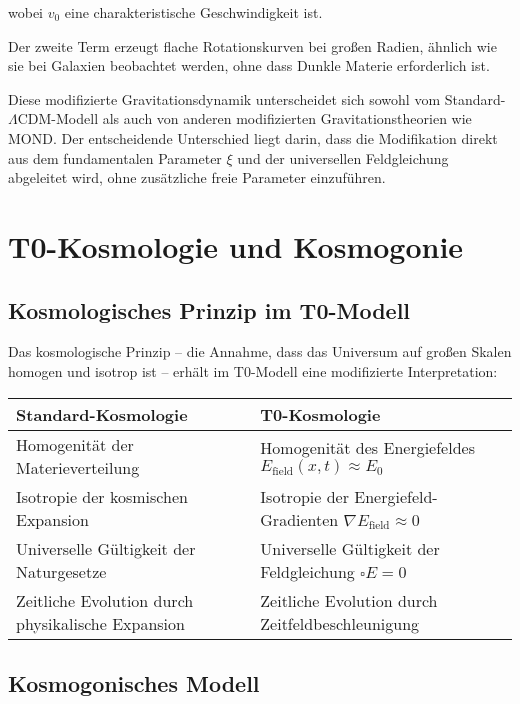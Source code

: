 \documentclass[12pt,a4paper]{article}
\theoremstyle{definition}
\begin{document}
wobei $v_0$ eine charakteristische Geschwindigkeit ist.

Der zweite Term erzeugt flache Rotationskurven bei großen Radien, ähnlich wie sie bei Galaxien beobachtet werden, ohne dass Dunkle Materie erforderlich ist.

\begin{wichtig}
Diese modifizierte Gravitationsdynamik unterscheidet sich sowohl vom Standard-$\Lambda$CDM-Modell als auch von anderen modifizierten Gravitationstheorien wie MOND. Der entscheidende Unterschied liegt darin, dass die Modifikation direkt aus dem fundamentalen Parameter $\xi$ und der universellen Feldgleichung abgeleitet wird, ohne zusätzliche freie Parameter einzuführen.
\end{wichtig}

\section{T0-Kosmologie und Kosmogonie}

\subsection{Kosmologisches Prinzip im T0-Modell}

Das kosmologische Prinzip – die Annahme, dass das Universum auf großen Skalen homogen und isotrop ist – erhält im T0-Modell eine modifizierte Interpretation:

\begin{center}
	\begin{tabular}{|p{7cm}|p{7cm}|}
		\hline
		\textbf{Standard-Kosmologie} & \textbf{T0-Kosmologie} \\
		\hline
		Homogenität der Materieverteilung & Homogenität des Energiefeldes $E_{\text{field}}(x,t) \approx E_0$ \\
		\hline
		Isotropie der kosmischen Expansion & Isotropie der Energiefeld-Gradienten $\nabla E_{\text{field}} \approx 0$ \\
		\hline
		Universelle Gültigkeit der Naturgesetze & Universelle Gültigkeit der Feldgleichung $\square E = 0$ \\
		\hline
		Zeitliche Evolution durch physikalische Expansion & Zeitliche Evolution durch Zeitfeldbeschleunigung \\
		\hline
	\end{tabular}
\end{center}

\subsection{Kosmogonisches Modell}
\end{document}
